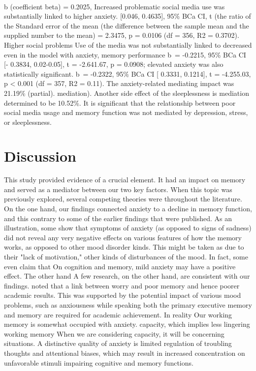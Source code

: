 \documentclass[12pt]{report}
\begin{document}
\paragraph{}
b (coefficient beta) = 0.2025, Increased problematic social media use was substantially linked to higher anxiety.
[0.046, 0.4635], 95\% BCa CI, t (the ratio of the
Standard error of the mean (the difference between the sample mean and the supplied number to the mean) = 2.3475, p =
0.0106 (df = 356, R2 = 0.3702). Higher social problems
Use of the media was not substantially linked to decreased
even in the model with anxiety, memory performance
b = -0.2215, 95\% BCa CI [- 0.3834, 0.02-0.05], t = -2.641.67, p = 0.0908; elevated anxiety was also statistically significant.
b = -0.2322, 95\% BCa CI [ 0.3331, 0.1214], t = -4.255.03, p < 0.001 (df = 357, R2 = 0.11). The anxiety-related mediating impact was 21.19\% (partial).
mediation). Another side effect of the sleeplessness is mediation
determined to be 10.52\%.
It is significant that the relationship between poor social media usage and memory function was not mediated by depression, stress, or sleeplessness.

\section*{Discussion}
\paragraph{}
This study provided evidence of a crucial element.
It had an impact on memory and served as a mediator
between our two key factors. When this topic was previously explored, several competing theories were
throughout the literature. On the one hand, our findings
connected anxiety to a decline in memory function, and this
contrary to some of the earlier findings that were published. As an illustration, some show that symptoms
of anxiety (as opposed to signs of sadness) did
not reveal any very negative effects on
various features of how the memory works, as opposed to other
mood disorder kinds. This might be taken as
due to their "lack of motivation," other kinds of
disturbances of the mood.
In fact, some even claim that
On cognition and memory, mild anxiety may have a positive effect. The other hand
A few research, on the other hand, are consistent with our findings.
noted that a link between worry and poor memory
and hence poorer academic results.
This was supported by the potential impact of various
mood problems, such as anxiousness while speaking
both the primary executive memory and memory
are required for academic achievement. In reality
Our working memory is somewhat occupied with anxiety.
capacity, which implies less lingering working memory
When we are considering capacity, it will be
concerning situations.
A distinctive quality
of anxiety is limited regulation of troubling thoughts and attentional biases, which may result in increased concentration on
unfavorable stimuli impairing cognitive and memory functions.



\end{document}
